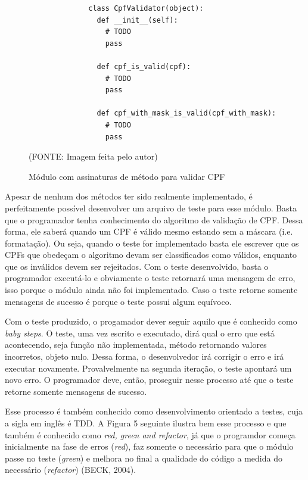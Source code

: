 \documentclass[
    12pt,       %
    openright,      %
    twoside,      %
    a4paper,      %
    english,      %
    french,       %
    spanish,      %
    brazil,       %
    ]{abntex2}
\begin{document}
      \begin{figure}[htpb]
          \begin{lstlisting}
              class CpfValidator(object):
                def __init__(self):
                  # TODO
                  pass

                def cpf_is_valid(cpf):
                  # TODO
                  pass

                def cpf_with_mask_is_valid(cpf_with_mask):
                  # TODO
                  pass
          \end{lstlisting}
          \caption{\label{fig:passaro}Módulo com assinaturas de método para validar CPF}\vspace{-1.2\baselineskip}
          \centering
          \begin{center}(FONTE: Imagem feita pelo autor)\end{center}
      \end{figure}

      Apesar de nenhum dos métodos ter sido realmente implementado, é perfeitamente
      possível desenvolver um arquivo de teste para esse módulo. Basta que o programador
      tenha conhecimento do algoritmo de validação de CPF. Dessa forma, ele saberá quando
      um CPF é válido mesmo estando sem a máscara (i.e. formatação). Ou seja, quando
      o teste for implementado basta ele escrever que os CPFs que obedeçam o algoritmo
      devam ser classificados como válidos, enquanto que os inválidos devem ser
      rejeitados. Com o teste desenvolvido, basta o programador executá-lo e
      obviamente o teste retornará uma mensagem de erro, isso porque o módulo ainda não
      foi implementado. Caso o teste retorne somente mensagens de sucesso é porque o
      teste possui algum equívoco.

      Com o teste produzido, o progamador dever seguir aquilo que é conhecido como
      \textit{baby steps}. O teste, uma vez escrito e executado, dirá qual o erro
      que está acontecendo, seja função não implementada, método retornando valores
      incorretos, objeto nulo. Dessa forma, o desenvolvedor irá corrigir o erro e
      irá executar novamente. Provalvelmente na segunda iteração, o teste apontará
      um novo erro. O programador deve, então, proseguir nesse processo até que o
      teste retorne somente mensagens de sucesso.

      Esse processo é também conhecido como desenvolvimento orientado a testes, cuja
      a sigla em inglês é TDD. A Figura 5 seguinte ilustra bem esse processo e que
      também é conhecido como \textit{red, green and refactor}, já que o programdor
      começa inicialmente na fase de erros (\textit{red}), faz somente o necessário
      para que o módulo passe no teste (\textit{green}) e melhora no final a qualidade
      do código a medida do necessário (\textit{refactor}) (BECK, 2004).
\end{document}
